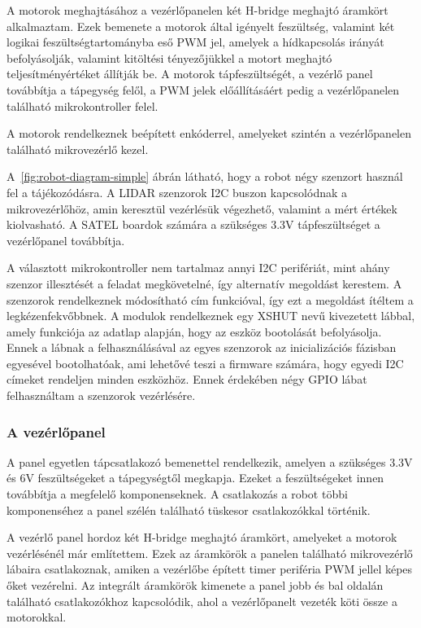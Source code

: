 \medskip

A motorok meghajtásához a vezérlőpanelen két H-bridge meghajtó áramkört
alkalmaztam. Ezek bemenete a motorok által igényelt feszültség, valamint két
logikai feszültségtartományba eső PWM jel, amelyek a hídkapcsolás irányát
befolyásolják, valamint kitöltési tényezőjükkel a motort meghajtó
teljesítményértéket állítják be. A motorok tápfeszültségét, a vezérlő panel
továbbítja a tápegység felől, a PWM jelek előállításáért pedig a vezérlőpanelen
található mikrokontroller felel.

A motorok rendelkeznek beépített enkóderrel, amelyeket szintén a vezérlőpanelen
található mikrovezérlő kezel.

\medskip

A~\ref{fig:robot-diagram-simple} ábrán látható, hogy a robot négy szenzort
használ fel a tájékozódásra. A LIDAR szenzorok I2C buszon kapcsolódnak a
mikrovezérlőhöz, amin keresztül vezérlésük végezhető, valamint a mért értékek
kiolvasható. A SATEL boardok számára a szükséges 3.3V tápfeszültséget a
vezérlőpanel továbbítja.

A választott mikrokontroller nem tartalmaz annyi I2C perifériát, mint ahány
szenzor illesztését a feladat megkövetelné, így alternatív megoldást kerestem. A
szenzorok rendelkeznek módosítható cím funkcióval, így ezt a megoldást ítéltem a
legkézenfekvőbbnek. A modulok rendelkeznek egy XSHUT nevű kivezetett lábbal,
amely funkciója az adatlap alapján, hogy az eszköz bootolását befolyásolja. Ennek
a lábnak a felhasználásával az egyes szenzorok az inicializációs fázisban
egyesével bootolhatóak, ami lehetővé teszi a firmware számára, hogy egyedi I2C
címeket rendeljen minden eszközhöz. Ennek érdekében négy GPIO lábat felhasználtam
a szenzorok vezérlésére.

\subsubsection{A vezérlőpanel}

A panel egyetlen tápcsatlakozó bemenettel rendelkezik, amelyen a szükséges 3.3V
és 6V feszültségeket a tápegységtől megkapja. Ezeket a feszültségeket innen
továbbítja a megfelelő komponenseknek. A csatlakozás a robot többi komponenséhez
a panel szélén található tüskesor csatlakozókkal történik.

\medskip

A vezérlő panel hordoz két H-bridge meghajtó áramkört, amelyeket a motorok
vezérlésénél már említettem. Ezek az áramkörök a panelen található mikrovezérlő
lábaira csatlakoznak, amiken a vezérlőbe épített timer periféria PWM jellel képes
őket vezérelni. Az integrált áramkörök kimenete a panel jobb és bal oldalán
található csatlakozókhoz kapcsolódik, ahol a vezérlőpanelt vezeték köti össze a
motorokkal.

